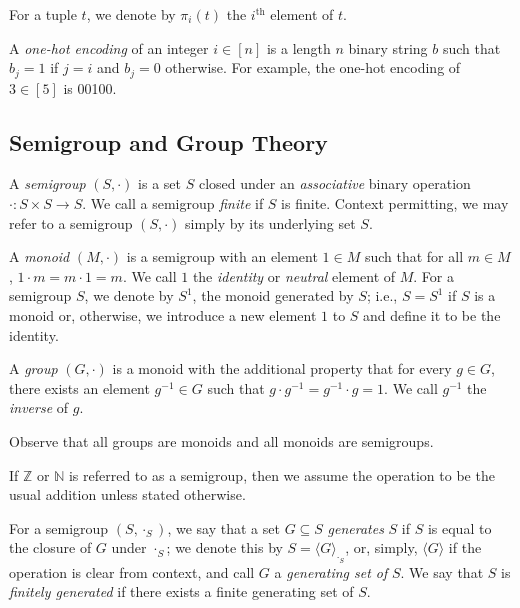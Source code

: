 \documentclass[a4paper,UKenglish,cleveref, autoref, thm-restate, anonymous]{lipics-v2021}
\begin{document}
\begin{definition}
    For a tuple $t$, we denote by $\pi_i(t)$ the $i^{\text{th}}$ element of $t$.
\end{definition}

\begin{definition}
    A \emph{one-hot encoding} of an integer $i \in [n]$ is a length $n$ binary string $b$ such that $b_j = 1$ if $j = i$ and $b_j = 0$ otherwise. For example, the one-hot encoding of $3 \in [5]$ is 00100.
\end{definition}

\subsection{Semigroup and Group Theory}\label{sec:backgroundsemi}

\begin{definition}
    A \emph{semigroup} $(S, \cdot)$ is a set $S$ closed under an \emph{associative} binary operation $\cdot : S \times S \rightarrow S$. We call a semigroup \emph{finite} if $S$ is finite. Context permitting, we may refer to a semigroup $(S, \cdot)$ simply by its underlying set $S$.

    A \emph{monoid} $(M, \cdot)$ is a semigroup with an element $1 \in M$ such that for all $m \in M$, $1 \cdot m = m \cdot 1 = m$. We call $1$ the \emph{identity} or \emph{neutral} element of $M$. For a semigroup $S$, we denote by $S^1$, the monoid generated by $S$; i.e., $S = S^1$ if $S$ is a monoid or, otherwise, we introduce a new element $1$ to $S$ and define it to be the identity.

    A \emph{group} $(G, \cdot)$ is a monoid with the additional property that for every $g \in G$, there exists an element $g^{-1} \in G$ such that $g \cdot g^{-1} = g^{-1} \cdot g = 1$. We call $g^{-1}$ the \emph{inverse} of $g$.
\end{definition}

\begin{remark}
    Observe that all groups are monoids and all monoids are semigroups.
\end{remark}

\begin{remark}
    If $\mathbb{Z}$ or $\mathbb{N}$ is referred to as a semigroup, then we assume the operation to be the usual addition unless stated otherwise.
\end{remark}

\begin{definition}
    For a semigroup $(S, \cdot_S)$, we say that a set $G \subseteq S$ \emph{generates} $S$ if $S$ is equal to the closure of $G$ under $\cdot_S$; we denote this by $S = \langle G \rangle_{\cdot_S}$, or, simply, $\langle G \rangle$ if the operation is clear from context, and call $G$ a \emph{generating set of} $S$. We say that $S$ is \emph{finitely generated} if there exists a finite generating set of $S$.
\end{definition}
\end{document}
